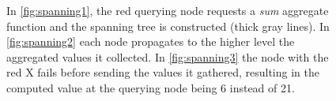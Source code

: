 \documentclass[a4paper,11pt,twoside]{report}
\begin{document}
\begin{figure}[ht]
\centering
{}\hfill
{}\hfill
{}

\caption{In \ref{fig:spanning1}, the  red querying node requests a \textit{sum} aggregate function and the spanning tree is constructed (thick gray lines). In \ref{fig:spanning2} each node propagates to the higher level the aggregated values it collected. In \ref{fig:spanning3} the node with the red X fails before sending the values it gathered, resulting in the computed value at the querying node being 6 instead of 21.}
\label{fig:simpletree}

\end{figure}
\end{document}
